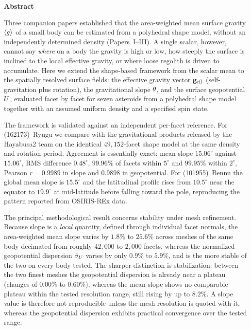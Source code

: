 {\noindent\large\bfseries Abstract}\\[0.4em]
{\noindent\small
Three companion papers established that the area-weighted mean surface gravity
$\langle g\rangle$ of a small body can be estimated from a polyhedral shape model,
without an independently determined density (Papers~I--III). A single scalar,
however, cannot say \emph{where} on a body the gravity is high or low, how
steeply the surface is inclined to the local effective gravity, or where loose
regolith is driven to accumulate. Here we extend the shape-based framework from
the scalar mean to the spatially resolved surface fields: the effective gravity
vector $\mathbf{g}_{\mathrm{eff}}$ (self-gravitation plus rotation), the gravitational slope
$\theta$, and the surface geopotential $U$, evaluated facet by facet for
seven asteroids from a polyhedral shape model together with an assumed uniform
density and a specified spin state.

The framework is validated against an independent per-facet reference. For
(162173)~Ryugu we compare with the gravitational products released by the
Hayabusa2 team on the identical $49{,}152$-facet shape model at the same
density and rotation period. Agreement is essentially exact: mean slope
$15.06^{\circ}$ against $15.06^{\circ}$, RMS difference $0.48^{\circ}$,
$99.96\%$ of facets within $5^{\circ}$ and $99.95\%$ within $2^{\circ}$,
Pearson $r=0.9989$ in slope and $0.9898$ in geopotential. For (101955)~Bennu the global
mean slope is $15.5^{\circ}$ and the latitudinal profile rises from
$10.5^{\circ}$ near the equator to $19.9^{\circ}$ at mid-latitude before
falling toward the pole, reproducing the pattern reported from OSIRIS-REx data.

The principal methodological result concerns stability under mesh refinement.
Because slope is a \emph{local} quantity, defined through individual facet
normals, the area-weighted mean slope varies by $1.8\%$ to $25.6\%$ across
meshes of the same body decimated from roughly $42{,}000$ to $2{,}000$ facets,
whereas the normalized geopotential dispersion $\tilde{\sigma}_{U}$ varies by only $0.9\%$
to $5.9\%$, and is the more stable of the two on every body tested. The
sharper distinction is stabilization: between the two finest meshes the
geopotential dispersion is already near a plateau (changes of $0.00\%$ to
$0.60\%$), whereas the mean slope shows no comparable plateau within the tested
resolution range, still rising by up to $8.2\%$. A slope value is therefore not
reproducible unless the mesh resolution is quoted with it, whereas the
geopotential dispersion exhibits practical convergence over the tested range.

}

